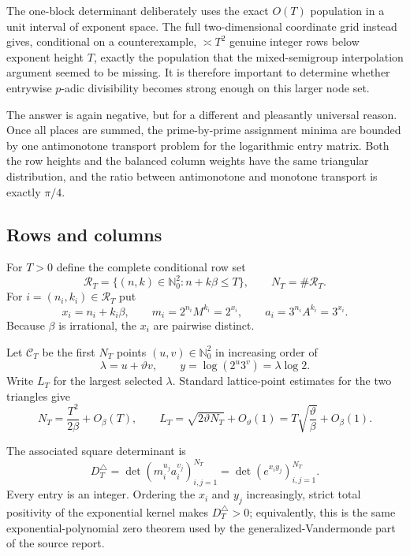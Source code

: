 \documentclass[11pt,oneside]{article}
\theoremstyle{definition}
\theoremstyle{remark}
\newcommand{\Nzero}{\mathbb N_0}
\begin{document}
The one-block determinant deliberately uses the exact $O(T)$ population in a unit interval of
exponent space.  The full two-dimensional coordinate grid instead gives, conditional on a
counterexample, $\asymp T^2$ genuine integer rows below exponent height $T$, exactly the
population that the mixed-semigroup interpolation argument seemed to be missing.  It is therefore
important to determine whether entrywise $p$-adic divisibility becomes strong enough on this
larger node set.

The answer is again negative, but for a different and pleasantly universal reason.  Once all
places are summed, the prime-by-prime assignment minima are bounded by one antimonotone
transport problem for the logarithmic entry matrix.  Both the row heights and the balanced
column weights have the same triangular distribution, and the ratio between antimonotone and
monotone transport is exactly $\pi/4$.

\subsection{Rows and columns}

For $T>0$ define the complete conditional row set
\begin{equation}\label{eq:grid-rows}
 \mathcal R_T=
 \{(n,k)\in\Nzero^2:n+k\beta\le T\},
 \qquad N_T=\#\mathcal R_T.
\end{equation}
For $i=(n_i,k_i)\in\mathcal R_T$ put
\begin{equation}\label{eq:grid-row-values}
 x_i=n_i+k_i\beta,
 \qquad m_i=2^{n_i}M^{k_i}=2^{x_i},
 \qquad a_i=3^{n_i}A^{k_i}=3^{x_i}.
\end{equation}
Because $\beta$ is irrational, the $x_i$ are pairwise distinct.

Let $\mathcal C_T$ be the first $N_T$ points $(u,v)\in\Nzero^2$ in increasing order of
\[
 \lambda=u+\vartheta v,
 \qquad
 y=\log(2^u3^v)=\lambda\log2.
\]
Write $L_T$ for the largest selected $\lambda$.  Standard lattice-point estimates for the two
triangles give
\begin{equation}\label{eq:grid-cardinality}
 N_T=\frac{T^2}{2\beta}+O_\beta(T),
 \qquad
 L_T=\sqrt{2\vartheta N_T}+O_\vartheta(1)
      =T\sqrt{\frac{\vartheta}{\beta}}+O_\beta(1).
\end{equation}

The associated square determinant is
\begin{equation}\label{eq:grid-determinant}
 D_T^{\triangle}
 =\det\!\left(m_i^{u_j}a_i^{v_j}\right)_{i,j=1}^{N_T}
 =\det\!\left(e^{x_i y_j}\right)_{i,j=1}^{N_T}.
\end{equation}
Every entry is an integer.  Ordering the $x_i$ and $y_j$ increasingly, strict total positivity
of the exponential kernel makes $D_T^{\triangle}>0$; equivalently, this is the same
exponential-polynomial zero theorem used by the generalized-Vandermonde part of the source
report.
\end{document}
